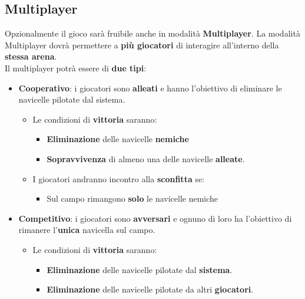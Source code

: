         \subsection{Multiplayer}
            Opzionalmente il gioco sarà fruibile anche in modalità \textbf{Multiplayer}. 
            La modalità Multiplayer dovrà permettere a \textbf{più giocatori} di interagire all'interno della \textbf{stessa arena}.\\
            Il multiplayer potrà essere di \textbf{due tipi}:
            \begin{itemize}
                \item \textbf{Cooperativo}: i giocatori sono \textbf{alleati} e hanno l'obiettivo di eliminare le navicelle pilotate dal sistema. 
                \begin{itemize}
                    \item  Le condizioni di \textbf{vittoria} saranno:
                        \begin{itemize}
                            \item \textbf{Eliminazione} delle navicelle \textbf{nemiche}
                            \item \textbf{Sopravvivenza} di almeno una delle navicelle \textbf{alleate}.
                        \end{itemize}
                    
                     \item  I giocatori andranno incontro alla \textbf{sconfitta} se:
                        \begin{itemize}
                            \item Sul campo rimangono \textbf{solo} le navicelle nemiche
                        \end{itemize}
                \end{itemize}
                
                \item \textbf{Competitivo}: i giocatori sono \textbf{avversari} e ognuno di loro ha l'obiettivo di rimanere l'\textbf{unica} navicella sul campo. 
                \begin{itemize}
                    \item  Le condizioni di \textbf{vittoria} saranno:
                        \begin{itemize}
                            \item \textbf{Eliminazione} delle navicelle pilotate dal \textbf{sistema}.
                            \item \textbf{Eliminazione} delle navicelle pilotate da altri \textbf{giocatori}.
                        \end{itemize}
                    

\end{itemize}
\end{itemize}
